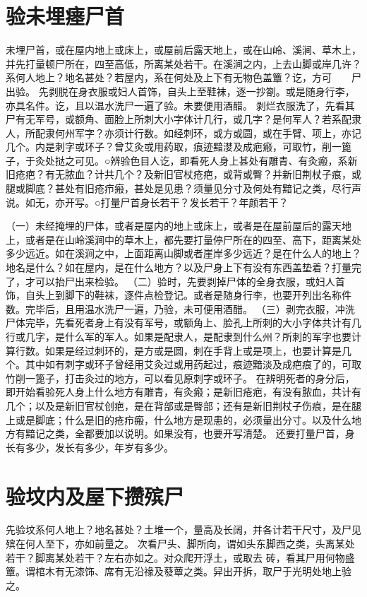 \documentclass[12pt,UTF8]{ctexbook}
\begin{document}
\chapter{验未埋瘗尸首}

未埋尸首，或在屋内地上或床上，或屋前后露天地上，或在山岭、溪涧、草木上，并先打量顿尸所在，四至高低，所离某处若干。在溪涧之内，上去山脚或岸几许？系何人地上？地名甚处？若屋内，系在何处及上下有无物色盖簟？讫，方可　　尸出验。
先剥脱在身衣服或妇人首饰，自头上至鞋袜，逐一抄劄。或是随身行李，亦具名件。讫，且以温水洗尸一遍了验。未要便用酒醋。
剥烂衣服洗了，先看其尸有无军号，或额角、面脸上所刺大小字体计几行，或几字？是何军人？若系配隶人，所配隶何州军字？亦须计行数。如经刺环，或方或圆，或在手臂、项上，亦记几个。内是刺字或环子？曾艾灸或用药取，痕迹黯漤及成疤瘢，可取竹，削一篦子，于灸处挞之可见。○辨验色目人讫，即看死人身上甚处有雕青、有灸瘢，系新旧疮疤？有无脓血？计共几个？及新旧官杖疮疤，或背或臀？并新旧荆杖子痕，或腿或脚底？甚处有旧疮疖瘢，甚处是见患？须量见分寸及何处有黯记之类，尽行声说。如无，亦开写。○打量尸首身长若干？发长若干？年颜若干？


（一）未经掩埋的尸体，或者是屋内的地上或床上，或者是在屋前屋后的露天地上，或者是在山岭溪涧中的草木上，都先要打量停尸所在的四至、高下，距离某处多少远近。如在溪涧之中，上面距离山脚或者崖岸多少远近？是在什么人的地上？地名是什么？如在屋内，是在什么地方？以及尸身上下有没有东西盖垫着？打量完了，才可以抬尸出来检验。
（二）验时，先要剥掉尸体的全身衣服，或妇人首饰，自头上到脚下的鞋袜，逐件点检登记。或者是随身行李，也要开列出名称件数。完毕后，且用温水洗尸一遍，乃验，未可便用酒醋。
（三）剥完衣服，冲洗尸体完毕，先看死者身上有没有军号，或额角上、脸孔上所刺的大小字体共计有几行或几字，是什么军的军人。如果是配隶人，是配隶到什么州？所刺的军字也要计算行数。如果是经过刺环的，是方或是圆，刺在手背上或是项上，也要计算是几个。其中如有刺字或环子曾经用艾灸过或用药起过，痕迹黯淡及成疤痕了的，可取竹削一篦子，打击灸过的地方，可以看见原刺字或环子。
在辨明死者的身分后，即开始看验死人身上什么地方有雕青，有灸瘢；是新旧疮疤，有没有脓血，共计有几个；以及是新旧官杖创疤，是在背部或是臀部；还有是新旧荆杖子伤痕，是在腿上或是脚底；什么是旧的疮疖瘢，什么地方是现患的，必须量出分寸。以及什么地方有黯记之类，全都要加以说明。如果没有，也要开写清楚。
还要打量尸首，身长有多少，发长有多少，年岁有多少。


\chapter{验坟内及屋下攒殡尸}

先验坟系何人地上？地名甚处？土堆一个，量高及长阔，并各计若干尺寸，及尸见 殡在何人至下，亦如前量之。
次看尸头、脚所向，谓如头东脚西之类，头离某处若干？脚离某处若干？左右亦如之。对众爬开浮土，或取去 砖，看其尸用何物盛簟。谓棺木有无漆饰、席有无沿禒及蕟蕈之类。舁出开拆，取尸于光明处地上验之。
\end{document}
